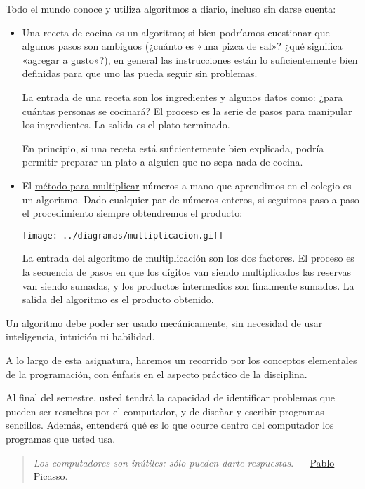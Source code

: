 Todo el mundo conoce y utiliza algoritmos a diario, incluso sin darse
cuenta:

\begin{itemize}
\item
  Una receta de cocina es un algoritmo; si bien podríamos cuestionar que
  algunos pasos son ambiguos (¿cuánto es «una pizca de sal»? ¿qué
  significa «agregar a gusto»?), en general las instrucciones están lo
  suficientemente bien definidas para que uno las pueda seguir sin
  problemas.

  La entrada de una receta son los ingredientes y algunos datos como:
  ¿para cuántas personas se cocinará? El proceso es la serie de pasos
  para manipular los ingredientes. La salida es el plato terminado.

  En principio, si una receta está suficientemente bien explicada,
  podría permitir preparar un plato a alguien que no sepa nada de
  cocina.
\end{itemize}

\begin{itemize}
\item
  El
  \href{http://es.wikipedia.org/wiki/Algoritmo\_de\_multiplicación}{método
  para multiplicar} números a mano que aprendimos en el colegio es un
  algoritmo. Dado cualquier par de números enteros, si seguimos paso a
  paso el procedimiento siempre obtendremos el producto:

  \texttt{[image: ../diagramas/multiplicacion.gif]}

  La entrada del algoritmo de multiplicación son los dos factores. El
  proceso es la secuencia de pasos en que los dígitos van siendo
  multiplicados las reservas van siendo sumadas, y los productos
  intermedios son finalmente sumados. La salida del algoritmo es el
  producto obtenido.
\end{itemize}

Un algoritmo debe poder ser usado mecánicamente, sin necesidad de usar
inteligencia, intuición ni habilidad.

A lo largo de esta asignatura, haremos un recorrido por los conceptos
elementales de la programación, con énfasis en el aspecto práctico de la
disciplina.

Al final del semestre, usted tendrá la capacidad de identificar
problemas que pueden ser resueltos por el computador, y de diseñar y
escribir programas sencillos. Además, entenderá qué es lo que ocurre
dentro del computador los programas que usted usa.

\begin{quote}
\emph{Los computadores son inútiles: sólo pueden darte respuestas}. ---
\href{http://es.wikipedia.org/wiki/Pablo\_Picasso}{Pablo Picasso}.
\end{quote}
